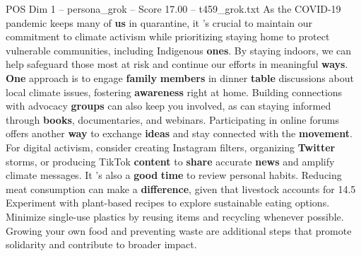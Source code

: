\begin{textsample}{POS Dim 1 – persona\_grok – Score 17.00 – t459\_grok.txt}  \label{ex:f1_pos_035}
As the COVID-19 pandemic keeps many of \textbf{us} in quarantine, it 's crucial to maintain our commitment to climate activism while prioritizing staying home to protect vulnerable communities, including Indigenous \textbf{ones}.
By staying indoors, we can help safeguard those most at risk and continue our efforts in meaningful \textbf{ways}. \textbf{One} approach is to engage \textbf{family} \textbf{members} in dinner \textbf{table} discussions about local climate issues, fostering \textbf{awareness} right at home.
Building connections with advocacy \textbf{groups} can also keep you involved, as can staying informed through \textbf{books}, documentaries, and webinars.
Participating in online forums offers another \textbf{way} to exchange \textbf{ideas} and stay connected with the \textbf{movement}.
For digital activism, consider creating Instagram filters, organizing \textbf{Twitter} storms, or producing TikTok \textbf{content} to \textbf{share} accurate \textbf{news} and amplify climate messages.
It 's also a \textbf{good} \textbf{time} to review personal habits.
Reducing meat consumption can make a \textbf{difference}, given that livestock accounts for 14.5 %
Experiment with plant-based recipes to explore sustainable eating options.
Minimize single-use plastics by reusing items and recycling whenever possible.
Growing your own food and preventing waste are additional steps that promote solidarity and contribute to broader impact.

\end{textsample}
